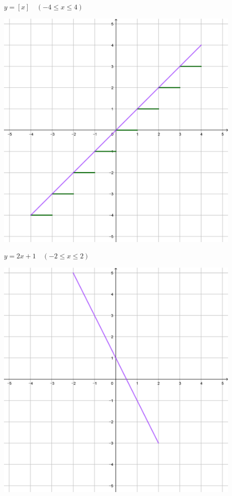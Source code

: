 \documentclass[a4paper]{oblivoir}
\begin{document}
\begin{minipage}{0.45\textwidth}\centering
\(y=[x]\quad(-4\le x\le4)\)
\par\bigskip\includegraphics[width=0.9\textwidth]{img/y=[x]}
\end{minipage}\bigskip\bigskip\par
\begin{minipage}{0.45\textwidth}\centering
\(y=2x+1\quad(-2\le x\le2)\)
\par\bigskip\includegraphics[width=0.9\textwidth]{img/y=-2x+1}
\end{minipage}
\end{document}
